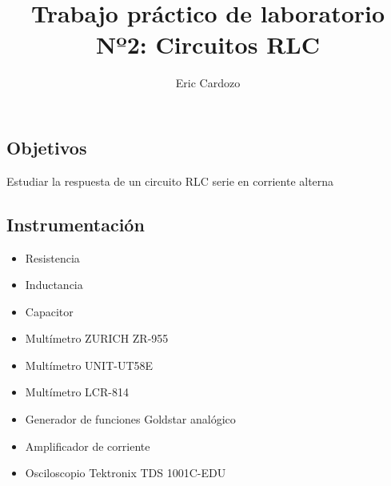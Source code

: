 \documentclass[12pt,a4paper]{article}
\author{Eric Cardozo}
\title{Trabajo pr\'actico de laboratorio Nº2: Circuitos RLC}
\begin{document}

\maketitle

\subsection*{Objetivos}
Estudiar la respuesta de un circuito RLC serie en corriente alterna

\subsection*{Instrumentaci\'on}
\begin{itemize}
\item Resistencia
\item Inductancia
\item Capacitor
\item Multímetro ZURICH ZR-955
\item Multímetro UNIT-UT58E
\item Multímetro LCR-814
\item Generador de funciones Goldstar analógico
\item Amplificador de corriente
\item Osciloscopio Tektronix TDS 1001C-EDU
\end{itemize}
\end{document}
